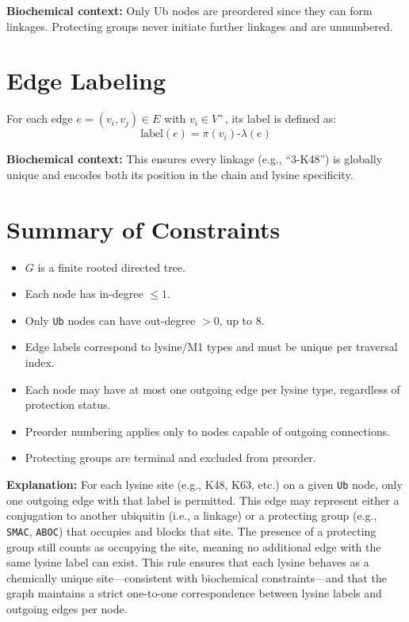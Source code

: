 \documentclass[12pt]{article}
\begin{document}
\textbf{Biochemical context:} Only Ub nodes are preordered since they can form linkages. Protecting groups never initiate further linkages and are unnumbered.

\section{Edge Labeling}
For each edge $e = (v_i, v_j) \in E$ with $v_i \in V^+$, its label is defined as:
\begin{equation*}
\text{label}(e) = \pi(v_i) \text{-} \lambda(e)
\end{equation*}

\textbf{Biochemical context:} This ensures every linkage (e.g., ``3-K48'') is globally unique and encodes both its position in the chain and lysine specificity.

\section{Summary of Constraints}

\begin{itemize}
    \item $G$ is a finite rooted directed tree.
    \item Each node has in-degree $\leq 1$.
    \item Only \texttt{Ub} nodes can have out-degree $> 0$, up to 8.
    \item Edge labels correspond to lysine/M1 types and must be unique per traversal index.
    \item Each node may have at most one outgoing edge per lysine type, regardless of protection status.
    \item Preorder numbering applies only to nodes capable of outgoing connections.
    \item Protecting groups are terminal and excluded from preorder.
\end{itemize}

\textbf{Explanation:} For each lysine site (e.g., K48, K63, etc.) on a given \texttt{Ub} node, only one outgoing edge with that label is permitted. This edge may represent either a conjugation to another ubiquitin (i.e., a linkage) or a protecting group (e.g., \texttt{SMAC}, \texttt{ABOC}) that occupies and blocks that site. The presence of a protecting group still counts as occupying the site, meaning no additional edge with the same lysine label can exist. This rule ensures that each lysine behaves as a chemically unique site—consistent with biochemical constraints—and that the graph maintains a strict one-to-one correspondence between lysine labels and outgoing edges per node.
\end{document}
